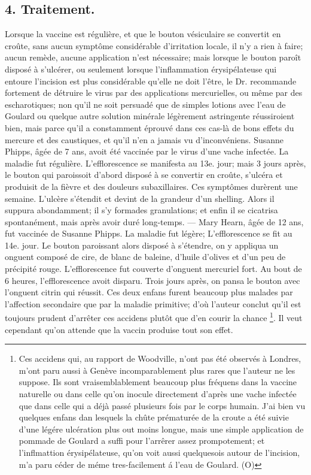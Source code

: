 \subsection{4. Traitement.}
Lorsque la vaccine est régulière, et que le bouton vésiculaire se convertit en croûte, sans aucun symptôme considérable d'irritation locale, il n'y a rien à faire; aucun remède, aucune application n'est nécessaire; mais lorsque le bouton paroît disposé à s'ulcérer, ou seulement lorsque l'inflammation érysipélateuse qui entoure l'incision est plus considérable qu'elle ne doit l'être, le Dr. recommande fortement de détruire le virus par des applications mercurielles, ou même par des escharotiques; non qu'il ne soit persuadé que de simples lotions avec l'eau de Goulard ou quelque autre solution minérale légèrement astringente réussiroient bien, mais parce qu'il a constamment éprouvé dans ces cas-là de bons effets du mercure et des caustiques, et qu'il n'en a jamais vu d'inconvéniens.
Susanne Phipps, âgée de 7 ans, avoit été vaccinée par le virus d'une vache infectée. La maladie fut régulière. L'efflorescence se manifesta au 13e. jour; mais 3 jours après, le bouton qui paroissoit d'abord disposé à se convertir en croûte, s'ulcéra et produisit de la fièvre et des douleurs subaxillaires. Ces\setcounter{page}{283} symptômes durèrent une semaine. L'ulcère s'étendit et devint de la grandeur d'un shelling. Alors il suppura abondamment; il s'y formades granulations; et enfin il se cicatrisa spontanément, mais après avoir duré long-temps. — Mary Hearn, âgée de 12 ans, fut vaccinée de Susanne Phipps. La maladie fut légère; L'efflorescence se fit au 14e. jour. Le bouton paroissant alors disposé à s'étendre, on y appliqua un onguent composé de cire, de blanc de baleine, d'huile d'olives et d'un peu de précipité rouge. L'efflorescence fut couverte d'onguent mercuriel fort. Au bout de 6 heures, l'efflorescence avoit disparu. Trois jours après, on pansa le bouton avec l'onguent citrin qui réussit. Ces deux enfans furent beaucoup plus malades par l'affection secondaire que par la maladie primitive; d'où l'auteur conclut qu'il est toujours prudent d'arrêter ces accidens plutôt que d'en courir la chance \footnote{Ces accidens qui, au rapport de Woodville, n'ont pas été observés à Londres, m'ont paru aussi à Genève incomparablement plus rares que l'auteur ne les suppose. Ils sont vraisemblablement beaucoup plus fréquens dans la vaccine naturelle ou dans celle qu'on inocule directement d'après une vache infectée que dans celle qui a déjà passé plusieurs fois par le corps humain. J'ai bien vu quelques enfans dan lesquels la chûte prématurée de la croute a été suivie d'une légére ulcération plus out moins longue, mais une simple application de pommade de Goulard a suffi pour l'arrêrer assez prompotement; et l'inflmattion érysipélateuse, qu'on voit aussi quelquesois autour de l'incision, m'a paru céder de méme tres-facilement á l'eau de Goulard. (O)}. Il veut\setcounter{page}{284} cependant qu'on attende que la vaccin produise tout son effet.
